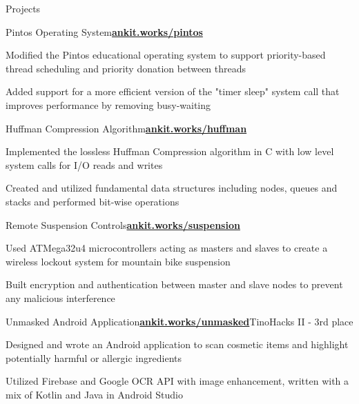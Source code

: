 \documentclass{resume}
\begin{document}
\begin{rSection}{\large Projects}

\begin{rSubsection}{Pintos Operating System}{\href{http://ankitsachdeva.com/pintos/}{\bf{{ankit.works/pintos}}}}{}{}
\item Modified the Pintos educational operating system to support priority-based thread scheduling and priority donation between threads
\item Added support for a more efficient version of the "timer sleep" system call that improves performance by removing busy-waiting
\end{rSubsection}

\begin{rSubsection}{Huffman Compression Algorithm}{\href{https://ankitsachdeva.com/huffman/}{\bf{{ankit.works/huffman}}}}{}{}
\item Implemented the lossless Huffman Compression algorithm in C with low level system calls for I/O reads and writes
\item Created and utilized fundamental data structures including nodes, queues and stacks and performed bit-wise operations
\end{rSubsection}

\begin{rSubsection}{Remote Suspension Controls}{\href{https://ankitsachdeva.com/suspension}{{\bf{ankit.works/suspension}}}}{}{}
\item Used ATMega32u4 microcontrollers acting as masters and slaves to create a wireless lockout system for mountain bike suspension
\item Built encryption and authentication between master and slave nodes to prevent any malicious interference
\end{rSubsection}

\begin{rSubsection}{Unmasked Android Application}{\href{https://ankitsachdeva.com/unmasked}{\bf{{ankit.works/unmasked}}}}{TinoHacks II - 3rd place}{}
\item Designed and wrote an Android application to scan cosmetic items and highlight potentially harmful or allergic ingredients
\item Utilized Firebase and Google OCR API with image enhancement, written with a mix of Kotlin and Java in Android Studio
\end{rSubsection}

\end{rSection}
\end{document}
